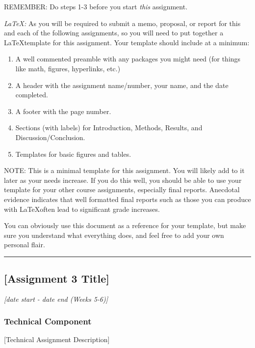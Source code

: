 \documentclass[12pt]{article}
\begin{document}
REMEMBER: Do steps 1-3 before you start \textit{this} assignment.

\bigskip

\noindent \textit{\LaTeX:} As you will be required to submit a memo, proposal, or report for this and each of the following assignments, so you will need to put together a \LaTeX template for this assignment.  Your template should include at a minimum:

\begin{enumerate}
	\item A well commented preamble with any packages you might need (for things like math, figures, hyperlinks, etc.)
	\item A header with the assignment name/number, your name, and the date completed.
	\item A footer with the page number.
	\item Sections (with labels) for Introduction, Methods, Results, and Discussion/Conclusion.
	\item Templates for basic figures and tables.
\end{enumerate}

NOTE: This is a minimal template for this assignment.  You will likely add to it later as your needs increase.  If you do this well, you should be able to use your template for your other course assignments, especially final reports.  Anecdotal evidence indicates that well formatted final reports such as those you can produce with \LaTeX often lead to significant grade increases.

You can obviously use this document as a reference for your template, but make sure you understand what everything does, and feel free to add your own personal flair.



\vspace{1em}\hrule\vspace{1em}
\subsection{[Assignment 3 Title]}
\label{ssec:a3}

\textit{[date start - date end (Weeks 5-6)]}


\subsubsection{Technical Component}
\label{ssaec:a3t}

[Technical Assignment Description]
\end{document}
